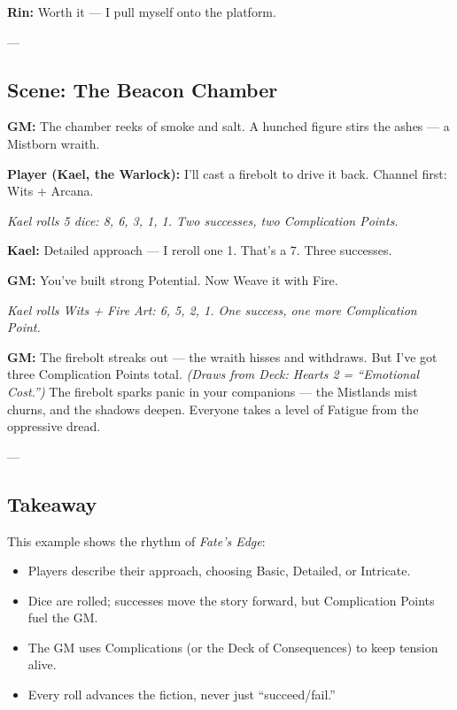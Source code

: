 \documentclass[11pt]{book}
\begin{document}
\textbf{Rin:} Worth it — I pull myself onto the platform.  

---

\subsection*{Scene: The Beacon Chamber}

\textbf{GM:} The chamber reeks of smoke and salt. A hunched figure stirs the ashes — a Mistborn wraith.  

\textbf{Player (Kael, the Warlock):} I’ll cast a firebolt to drive it back. Channel first: Wits + Arcana.  

\textit{Kael rolls 5 dice: 8, 6, 3, 1, 1. Two successes, two Complication Points.}  

\textbf{Kael:} Detailed approach — I reroll one 1. That’s a 7. Three successes.  

\textbf{GM:} You’ve built strong Potential. Now Weave it with Fire.  

\textit{Kael rolls Wits + Fire Art: 6, 5, 2, 1. One success, one more Complication Point.}  

\textbf{GM:} The firebolt streaks out — the wraith hisses and withdraws. But I’ve got three Complication Points total.  
\textit{(Draws from Deck: Hearts 2 = “Emotional Cost.”)}  
The firebolt sparks panic in your companions — the Mistlands mist churns, and the shadows deepen. Everyone takes a level of Fatigue from the oppressive dread.  

---

\subsection*{Takeaway}
This example shows the rhythm of \textit{Fate’s Edge}:
\begin{itemize}
  \item Players describe their approach, choosing Basic, Detailed, or Intricate.  
  \item Dice are rolled; successes move the story forward, but Complication Points fuel the GM.  
  \item The GM uses Complications (or the Deck of Consequences) to keep tension alive.  
  \item Every roll advances the fiction, never just “succeed/fail.”  
\end{itemize}
\end{document}
